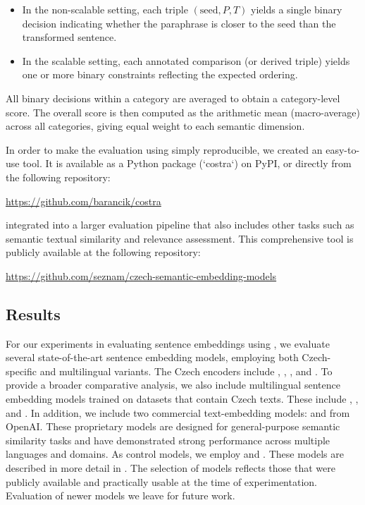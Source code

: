 \begin{itemize}
    \item In the non-scalable setting, each triple $(\text{seed}, P, T)$ yields a single binary decision indicating whether the paraphrase is closer to the seed than the transformed sentence.
    \item In the scalable setting, each annotated comparison (or derived triple) yields one or more binary constraints reflecting the expected ordering.
\end{itemize}

All binary decisions within a category are averaged to obtain a category-level score. The overall \costra score is then computed as the arithmetic mean (macro-average) across all categories, giving equal weight to each semantic dimension.

\noindent In order to make the evaluation using \costra simply reproducible, we created an easy-to-use tool. It is available as a Python package (`costra`) on PyPI, or directly from the following repository:
\begin{center}
\url{https://github.com/barancik/costra}
\end{center}

\cite{bednavr2024some} integrated \costra into a larger evaluation pipeline that also includes other tasks such as semantic textual similarity and relevance assessment. This comprehensive tool is publicly available at the following repository:

\begin{center}
    \url{https://github.com/seznam/czech-semantic-embedding-models}
\end{center}

\subsection{Results}
\label{costra:results}
For our experiments in evaluating sentence embeddings using \costra, we evaluate several state-of-the-art sentence embedding models, employing both Czech-specific and multilingual variants. The Czech encoders include \czert, \fernet, \robeczech, \simcse and \retromae. To provide a broader comparative analysis, we also include multilingual sentence embedding models trained on datasets that contain Czech texts. These include \labse, \xlmr, and \mepet.
In addition, we include two commercial text-embedding models: \tetrismall and \tetrilarge from OpenAI. These proprietary models are designed for general-purpose semantic similarity tasks and have demonstrated strong performance across multiple languages and domains. As control models, we employ \randombert and \random.  These models are described in more detail in . The selection of models reflects those that were publicly available and practically usable at the time of experimentation. Evaluation of newer models we leave for future work.

